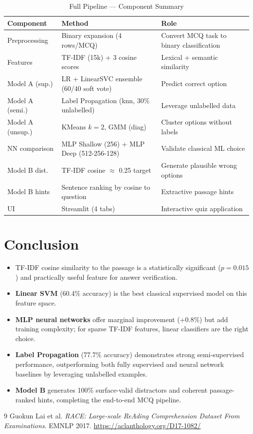 \documentclass[12pt,a4paper]{article}
\begin{document}
\begin{table}[H]
\centering
\caption{Full Pipeline — Component Summary}
\begin{tabular}{llp{6.5cm}}
  \toprule
  \textbf{Component} & \textbf{Method} & \textbf{Role} \\
  \midrule
  Preprocessing     & Binary expansion (4 rows/MCQ)                  & Convert MCQ task to binary classification \\
  Features          & TF-IDF (15k) + 3 cosine scores                 & Lexical + semantic similarity \\
  Model A (sup.)    & LR + LinearSVC ensemble (60/40 soft vote)       & Predict correct option \\
  Model A (semi.)   & Label Propagation (knn, 30\% unlabelled)        & Leverage unlabelled data \\
  Model A (unsup.)  & KMeans $k=2$, GMM (diag)                        & Cluster options without labels \\
  NN comparison     & MLP Shallow (256) + MLP Deep (512-256-128)      & Validate classical ML choice \\
  Model B dist.     & TF-IDF cosine $\approx$ 0.25 target             & Generate plausible wrong options \\
  Model B hints     & Sentence ranking by cosine to question          & Extractive passage hints \\
  UI                & Streamlit (4 tabs)                              & Interactive quiz application \\
  \bottomrule
\end{tabular}
\end{table}

\section{Conclusion}

\begin{itemize}
  \item TF-IDF cosine similarity to the passage is a statistically significant
        ($p = 0.015$) and practically useful feature for answer verification.
  \item \textbf{Linear SVM} (60.4\% accuracy) is the best classical supervised
        model on this feature space.
  \item \textbf{MLP neural networks} offer marginal improvement ($+0.8\%$) but
        add training complexity; for sparse TF-IDF features, linear classifiers
        are the right choice.
  \item \textbf{Label Propagation} (77.7\% accuracy) demonstrates strong
        semi-supervised performance, outperforming both fully supervised and
        neural network baselines by leveraging unlabelled examples.
  \item \textbf{Model B} generates 100\% surface-valid distractors and
        coherent passage-ranked hints, completing the end-to-end MCQ pipeline.
\end{itemize}

\begin{thebibliography}{9}
    Guokun Lai et al.
    \textit{RACE: Large-scale ReAding Comprehension Dataset From Examinations}.
    EMNLP 2017.
    \url{https://aclanthology.org/D17-1082/}
\end{thebibliography}
\end{document}
